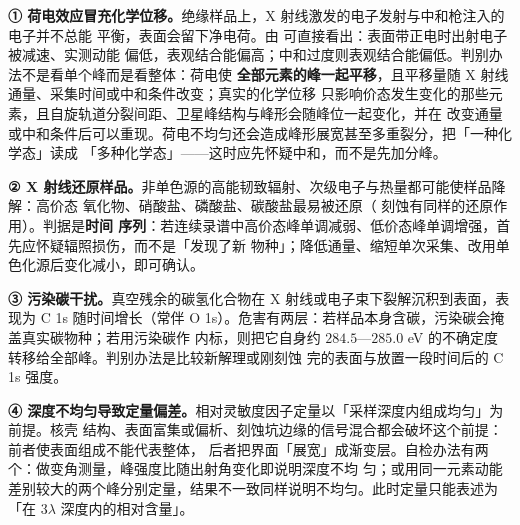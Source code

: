\begin{pitfall}
\textbf{① 荷电效应冒充化学位移。}绝缘样品上，X 射线激发的电子发射与中和枪注入的电子并不总能
平衡，表面会留下净电荷。由  可直接看出：表面带正电时出射电子被减速、实测动能
偏低，表观结合能偏高；中和过度则表观结合能偏低。判别办法不是看单个峰而是看整体：荷电使
\textbf{全部元素的峰一起平移}，且平移量随 X 射线通量、采集时间或中和条件改变；真实的化学位移
只影响价态发生变化的那些元素，且自旋轨道分裂间距、卫星峰结构与峰形会随峰位一起变化，并在
改变通量或中和条件后可以重现。荷电不均匀还会造成峰形展宽甚至多重裂分，把「一种化学态」读成
「多种化学态」——这时应先怀疑中和，而不是先加分峰。

\textbf{② X 射线还原样品。}非单色源的高能韧致辐射、次级电子与热量都可能使样品降解：高价态
氧化物、硝酸盐、磷酸盐、碳酸盐最易被还原（ 刻蚀有同样的还原作用）。判据是\textbf{时间
序列}：若连续录谱中高价态峰单调减弱、低价态峰单调增强，首先应怀疑辐照损伤，而不是「发现了新
物种」；降低通量、缩短单次采集、改用单色化源后变化减小，即可确认。

\textbf{③ 污染碳干扰。}真空残余的碳氢化合物在 X 射线或电子束下裂解沉积到表面，表现为 C 1s
随时间增长（常伴 O 1s）。危害有两层：若样品本身含碳，污染碳会掩盖真实碳物种；若用污染碳作
内标，则把它自身约 $284.5$—$285.0$ eV 的不确定度转移给全部峰。判别办法是比较新解理或刚刻蚀
完的表面与放置一段时间后的 C 1s 强度。

\textbf{④ 深度不均匀导致定量偏差。}相对灵敏度因子定量以「采样深度内组成均匀」为前提。核壳
结构、表面富集或偏析、刻蚀坑边缘的信号混合都会破坏这个前提：前者使表面组成不能代表整体，
后者把界面「展宽」成渐变层。自检办法有两个：做变角测量，峰强度比随出射角变化即说明深度不均
匀；或用同一元素动能差别较大的两个峰分别定量，结果不一致同样说明不均匀。此时定量只能表述为
「在 $3\lambda$ 深度内的相对含量」。
\end{pitfall}
